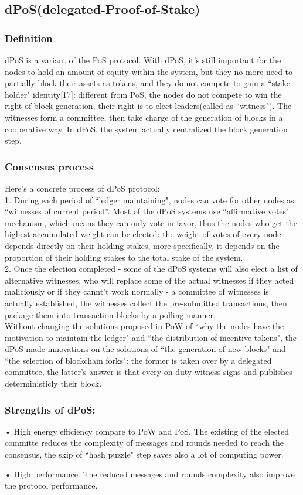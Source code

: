 \documentclass[doublespacing]{bmcart}
\begin{document}
\begin{CJK*}{UTF8}{gbsn}
\subsection{dPoS(delegated-Proof-of-Stake)}
\subsubsection*{Definition}	
dPoS is a variant of the PoS protocol. With dPoS, it's still important for the nodes to hold an amount of equity within the system, but they no more need to partially block their assets as tokens, and they do not compete to gain a ``stake holder" identity[17]: different from PoS, the nodes do not compete to win the right of block generation, their right is to elect leaders(called as ``witness"). The witnesses form a committee, then take charge of the generation of blocks in a cooperative way. In dPoS, the system actually centralized the block generation step.
 \subsubsection*{Consensus process}
Here's a concrete process of dPoS protocol:
\\1. During each period of ``ledger maintaining", nodes can vote for other nodes as “witnesses of current period”. Most of the dPoS systems use ``affirmative votes" mechanism, which means they can only vote in favor, thus the nodes who get the highest accumulated weight can be elected: the weight of votes of every node depends directly on their holding stakes, more specifically, it depends on the proportion of their holding stakes to the total stake of the system.
\\2. Once the election completed - some of the dPoS systems will also elect a list of alternative witnesses, who will replace some of the actual witnesses if they acted maliciously or if they cannt't work normally - a committee of witnesses is actually established, the witnesses collect the pre-submitted transactions, then package them into transaction blocks by a polling manner.
\\Without changing the solutions proposed in PoW of ``why the nodes have the motivation to maintain the ledger" and ``the distribution of incentive tokens", the dPoS made innovations on the solutions of ``the generation of new blocks" and ``the selection of blockchain forks": the former is taken over by a delegated committee, the latter's answer is that every on duty witness signs and publishes deterministicly their block.
\subsubsection*{Strengths of dPoS:}	
• High energy efficiency compare to PoW and PoS. The existing of the elected committe reduces the complexity of messages and rounds needed to reach the consensus, the skip of ``hash puzzle" step saves also a lot of computing power.
\par • High performance. The reduced messages and rounds complexity also improve the protocol performance. 

\end{CJK*}
\end{document}

